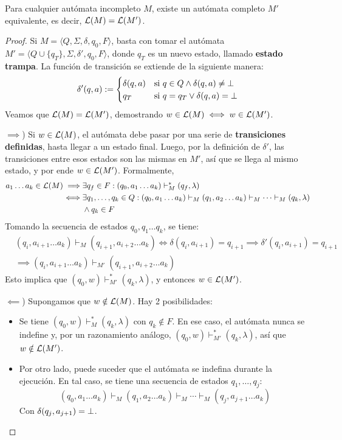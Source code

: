 \begin{theorem*}
    Para cualquier autómata incompleto $M$, existe un autómata completo $M'$ equivalente, es decir, $\mathcal{L}(M) = \mathcal{L}(M')$.
\end{theorem*}
\begin{proof}
    Si $M = \langle Q, \Sigma, \delta, q_0, F \rangle$, basta con tomar el autómata $M' = \langle Q \cup \{q_T\}, \Sigma, \delta', q_0, F \rangle$, donde $q_T$ es un nuevo estado, llamado \textbf{estado trampa}. La función de transición se extiende de la siguiente manera:
    $$
    \delta' (q, a) :=
    \begin{cases}
        \delta(q, a) & \text{si } q \in Q \land \delta(q, a) \neq \mathrm \perp \\
        q_T & \text{si } q = q_T \lor \delta(q, a) = \mathrm \perp
    \end{cases}
    $$
    Veamos que $\mathcal{L}(M) = \mathcal{L}(M')$, demostrando $w \in \mathcal{L}(M) \iff w \in \mathcal{L}(M')$.

    $\implies$) Si $w \in \mathcal{L}(M)$, el autómata debe pasar por una serie de \textbf{transiciones definidas}, hasta llegar a un estado final. Luego, por la definición de $\delta'$, las transiciones entre esos estados son las mismas en $M'$, así que se llega al mismo estado, y por ende $w \in \mathcal{L}(M')$. Formalmente,
    $$
    \begin{aligned}
        a_1 \dots a_k \in \mathcal{L}(M) \implies & \exists q_f \in F : (q_0, a_1 \dots a_k) \vdash_M^* (q_f, \lambda) \\
        \iff & \exists q_1, \dots, q_k \in Q : (q_0, a_1 \dots a_k) \vdash_M (q_1, a_2 \dots a_k) \vdash_M \cdots \vdash_M (q_k, \lambda)\\
        & \land q_k \in F
    \end{aligned}
    $$
    Tomando la secuencia de estados $q_0, q_1 \dots q_k$, se tiene:
    $$
    \begin{aligned}
        & (q_i, a_{i+1} \dots a_k) \vdash_M (q_{i+1}, a_{i+2} \dots a_k) \iff \delta(q_i, a_{i+1}) = q_{i+1} \implies \delta'(q_i, a_{i+1}) = q_{i+1} \\
        & \implies (q_i, a_{i+1} \dots a_k) \vdash_{M'} (q_{i+1}, a_{i+2} \dots a_k)
    \end{aligned}
    $$
    Esto implica que $(q_0, w) \vdash_{M'}^* (q_k, \lambda)$, y entonces $w \in \mathcal{L}(M')$.

    $\impliedby$) Supongamos que $w \notin \mathcal{L}(M)$. Hay 2 posibilidades:
    \begin{itemize}
        \item Se tiene $(q_0, w) \vdash_M^* (q_k, \lambda)$ con $q_k \notin F$. En ese caso, el autómata nunca se indefine y, por un razonamiento análogo, $(q_0, w) \vdash_{M'}^* (q_k, \lambda)$, así que $w \notin \mathcal{L}(M')$.
        \item Por otro lado, puede suceder que el autómata se indefina durante la ejecución. En tal caso, se tiene una secuencia de estados $q_1, \dots, q_j$:
        $$(q_0, a_1 \dots a_k) \vdash_M (q_1, a_2 \dots a_k) \vdash_M \cdots \vdash_M (q_j, a_{j+1} \dots a_k)$$
        Con $\delta(q_j, a_{j+1}) = \mathrm \perp$.


\end{itemize}
\end{proof}
